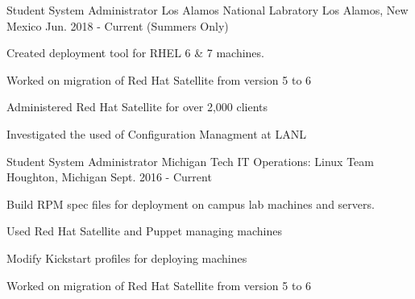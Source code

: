 

\begin{cventries}

  \cventry
    {Student System Administrator} %
    {Los Alamos National Labratory} %
    {Los Alamos, New Mexico} %
    {Jun. 2018 - Current (Summers Only)} %
    {
      \begin{cvitems} %
      \item {Created deployment tool for RHEL 6 \& 7 machines.}
        \item {Worked on migration of Red Hat Satellite from version 5 to 6}
        \item {Administered Red Hat Satellite for over 2,000 clients}
        \item {Investigated the used of Configuration Managment at LANL}
      \end{cvitems}
    }

  \cventry
    {Student System Administrator} %
    {Michigan Tech IT Operations: Linux Team} %
    {Houghton, Michigan} %
    {Sept. 2016 - Current} %
    {
      \begin{cvitems} %
        \item {Build RPM spec files for deployment on campus lab machines and servers.}
        \item {Used Red Hat Satellite and Puppet managing machines}
        \item {Modify Kickstart profiles for deploying machines}	
        \item {Worked on migration of Red Hat Satellite from version 5 to 6}
      \end{cvitems}
    }


\end{cventries}
